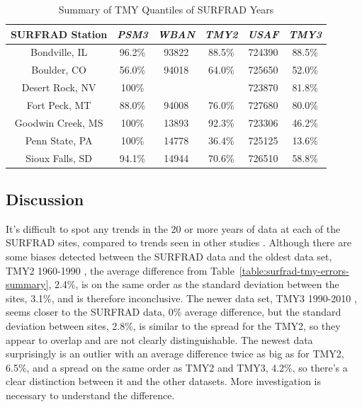 \documentclass[conference]{IEEEtran}
\begin{document}
\begin{table}[htbp]
\caption{Summary of TMY Quantiles of SURFRAD Years}
\begin{center}
\begin{tabular}{|c|c|c|c|c|c|}
\hline
\textbf{SURFRAD Station} & \textbf{\textit{PSM3}}& \textbf{\textit{WBAN}}& \textbf{\textit{TMY2}}& \textbf{\textit{USAF}}& \textbf{\textit{TMY3}} \\
\hline
Bondville, IL    & 96.2\%& 93822&  88.5\%&724390&  88.5\% \\
Boulder, CO      & 56.0\%& 94018&  64.0\%&725650&  52.0\% \\
Desert Rock, NV  & 100\% &      &        &723870&  81.8\% \\
Fort Peck, MT    & 88.0\%& 94008&  76.0\%&727680&  80.0\% \\
Goodwin Creek, MS& 100\% & 13893&  92.3\%&723306&  46.2\% \\
Penn State, PA   & 100\% & 14778&  36.4\%&725125&  13.6\% \\
Sioux Falls, SD  & 94.1\%& 14944&  70.6\%&726510&  58.8\% \\
\hline
\end{tabular}
\label{table:surfrad-tmy-quantile-summary}
\end{center}
\end{table}

\subsection{Discussion}
It's difficult to spot any trends in the 20 or more years of data at each of the SURFRAD sites, compared to trends seen in other studies \cite{Muller2014}. Although there are some biases detected between the SURFRAD data and the oldest data set, TMY2 1960-1990 \cite{Marion1995}, the average difference from Table~\ref{table:surfrad-tmy-errors-summary}, 2.4\%, is on the same order as the standard deviation between the sites, 3.1\%, and is therefore inconclusive. The newer data set, TMY3 1990-2010 \cite{Wilcox2012}, seems closer to the SURFRAD data, 0\% average difference, but the standard deviation between sites, 2.8\%, is similar to the spread for the TMY2, so they appear to overlap and are not clearly distinguishable. The newest data surprisingly is an outlier with an average difference twice as big as for TMY2, 6.5\%, and a spread on the same order as TMY2 and TMY3, 4.2\%, so there's a clear distinction between it and the other datasets. More investigation is necessary to understand the difference.
\end{document}
